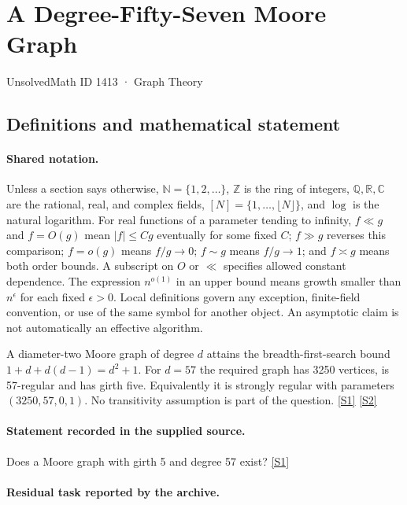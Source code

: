 \documentclass[11pt,a4paper]{article}
\newcommand{\N}{\mathbb{N}}
\newcommand{\Z}{\mathbb{Z}}
\newcommand{\Q}{\mathbb{Q}}
\newcommand{\R}{\mathbb{R}}
\newcommand{\C}{\mathbb{C}}
\newcommand{\sref}[2]{\hyperlink{source:#1:#2}{[S#2]}}
\begin{document}

\setcounter{section}{1412}

\section{A Degree-Fifty-Seven Moore Graph}\label{1413}

{\small\sffamily UnsolvedMath ID 1413 · Graph Theory}

\subsection{Definitions and mathematical statement}

\paragraph{Shared notation.}Unless a section says otherwise, $\N=\{1,2,\ldots\}$,
$\Z$ is the ring of integers, $\Q,\R,\C$ are the rational, real, and complex
fields, $[N]=\{1,\ldots,\lfloor N\rfloor\}$, and $\log$ is the natural
logarithm. For real functions of a parameter tending to infinity,
$f\ll g$ and $f=O(g)$ mean $|f|\leq Cg$ eventually for some fixed $C$;
$f\gg g$ reverses this comparison; $f=o(g)$ means $f/g\to0$;
$f\sim g$ means $f/g\to1$; and $f\asymp g$ means both order bounds.
A subscript on $O$ or $\ll$ specifies allowed constant dependence.
The expression $n^{o(1)}$ in an upper bound means growth smaller than
$n^\epsilon$ for each fixed $\epsilon>0$. Local definitions govern any
exception, finite-field convention, or use of the same symbol for another
object. An asymptotic claim is not automatically an effective algorithm.



A diameter-two Moore graph of degree $d$ attains the breadth-first-search bound $1+d+d(d-1)=d^2+1$. For $d=57$ the required graph has 3250 vertices, is 57-regular and has girth five. Equivalently it is strongly regular with parameters $(3250,57,0,1)$. No transitivity assumption is part of the question. \sref{1413}{1} \sref{1413}{2}

\paragraph{Statement recorded in the supplied source.}
Does a Moore graph with girth 5 and degree 57 exist? \sref{1413}{1}

\paragraph{Residual task reported by the archive.}
\end{document}
